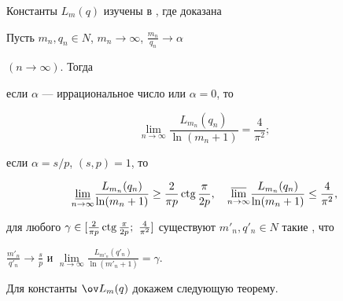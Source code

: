 Константы $L_m(q)$ изучены в \cite{7}, где доказана 


 


\begin{thm} 


Пусть $m_n,q_n\in N$, $m_n\to\infty$, $\frac{m_n}{q_n}\to\alpha$ 


$(n\to\infty)$. Тогда 


 


 если $\alpha$ --- иррациональное число или $\alpha=0$, то 


$$ 


\lim_{n\to\infty}\frac{L_{m_n}(q_n)}{\ln(m_n+1)}=\frac{4}{\pi^2}; 


$$ 


если $\alpha=s/p$, $(s,p)=1$, то 


$$ 


\underset{n\to\infty}{\varliminf}{} 


\frac{L_{m_n}(q_n)}{\ln(m_n+1)}\ge\frac{2}{\pi p}\ctg 


\frac{\pi}{2p},\quad \underset{n\to\infty}{\varlimsup}{} 


\frac{L_{m_n}(q_n)}{\ln(m_n+1)}\le\frac{4}{\pi^2},


$$ 


 


 для любого $\gamma\in[\frac{2}{\pi p}\ctg \frac{\pi}{2p};\ 


\frac{4}{\pi^2}]$ существуют $m'_n,q'_n\in N$ такие , что 


$\frac{m'_n}{q'_n}\to\frac{s}{p}$ и $\lim\limits_{n\to\infty} 


\frac{L_{m'_n}(q'_n)}{\ln(m'_n+1)}=\gamma$. 


\end{thm} 


 


Для константы $\ov L_m(q)$ докажем следующую теорему. 


 



